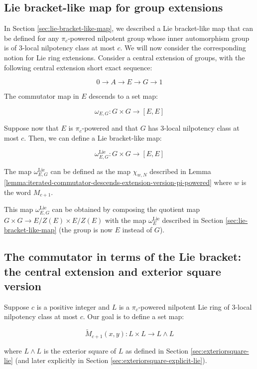 \subsection{Lie bracket-like map for group extensions}\label{sec:lie-bracket-like-map-for-extensions}

In Section \ref{sec:lie-bracket-like-map}, we described a Lie
bracket-like map that can be defined for any $\pi_c$-powered nilpotent
group whose inner automorphism group is of $3$-local nilpotency class
at most $c$. We will now consider the corresponding notion for Lie
ring extensions. Consider a central extension of groups, with the
following central extension short exact sequence:

$$0 \to A \to E \to G \to 1$$

The commutator map in $E$ descends to a set map:

$$\omega_{E,G}: G \times G \to [E,E]$$

Suppose now that $E$ is $\pi_c$-powered and that $G$ has $3$-local
nilpotency class at most $c$. Then, we can define a Lie bracket-like
map:

$$\omega_{E,G}^{\text{Lie}}: G \times G \to [E,E]$$

The map $\omega_{E,G}^{\text{Lie}}$ can be defined as the map
$\chi_{w,N}$ described in Lemma
\ref{lemma:iterated-commutator-descends-extension-version-pi-powered}
where $w$ is the word $M_{c+1}$.

This map $\omega_{E,G}^{\text{Lie}}$ can be obtained by composing the
quotient map $G \times G \to E/Z(E) \times E/Z(E)$ with the map
$\omega_E^{\text{Lie}}$ described in Section
\ref{sec:lie-bracket-like-map} (the group is now $E$ instead of $G$).

\subsection{The commutator in terms of the Lie bracket: the central extension and exterior square version}\label{sec:group-commutator-ito-lie-bracket-exteriorsquare-version}

Suppose $c$ is a positive integer and $L$ is a $\pi_c$-powered
nilpotent Lie ring of $3$-local nilpotency class at most $c$. Our goal
is to define a set map:

$$\tilde{M}_{c+1}(x,y): L \times L \to L \wedge L$$

where $L \wedge L$ is the exterior square of $L$ as defined in Section
\ref{sec:exteriorsquare-lie} (and later explicitly in Section
\ref{sec:exteriorsquare-explicit-lie}).

